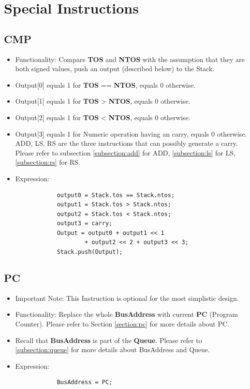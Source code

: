 \documentclass[11pt]{report}
\begin{document}
    \section{Special Instructions}
    \subsection{CMP}
    \label{subsection:cmp}
    \begin{itemize}
        \item Functionality: Compare \textbf{TOS} and \textbf{NTOS} with the assumption 
                that they are both signed values, push an output (described below) to the Stack.
        \item Output[0] equals 1 for \textbf{TOS} == \textbf{NTOS}, equals 0 otherwise.
        \item Output[1] equals 1 for \textbf{TOS} > \textbf{NTOS}, equals 0 otherwise.
        \item Output[2] equals 1 for \textbf{TOS} < \textbf{NTOS}, equals 0 otherwise.
        \item Output[3] equals 1 for Numeric operation having an carry, equals 0 otherwise.
                        ADD, LS, RS are the three instructions that can possibly generate a carry.
                        Please refer to subsection \ref{subsection:add} for ADD, \ref{subsection:ls} for LS, 
                        \ref{subsection:rs} for RS.
        \item Expression:
        \begin{verbatim}
            output0 = Stack.tos == Stack.ntos;
            output1 = Stack.tos > Stack.ntos;
            output2 = Stack.tos < Stack.ntos;
            output3 = carry;
            Output = output0 + output1 << 1 
                    + output2 << 2 + output3 << 3;
            Stack.push(Output);
        \end{verbatim}
    \end{itemize}

    \subsection{PC}
    \begin{itemize}
        \item Important Note: This Instruction is optional for the most simplistic design.
        \item Functionality: Replace the whole \textbf{BusAddress} with current \textbf{PC} (Program Counter). 
                Please refer to Section \ref{section:pc} for more details about PC.
        \item Recall that \textbf{BusAddress} is part of the \textbf{Queue}. Please refer to \ref{subsection:queue}
                for more details about BusAddress and Queue.
        \item Expression:
        \begin{verbatim}
            BusAddress = PC;
        \end{verbatim}
    \end{itemize}
\end{document}
